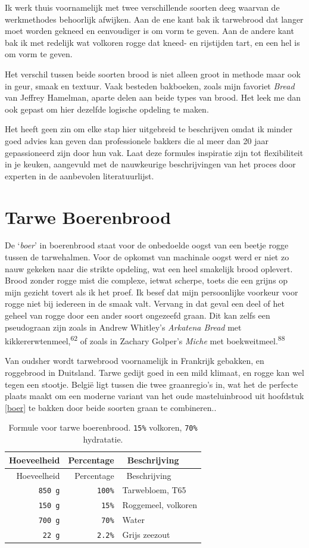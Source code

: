 \documentclass[
  11pt,
  dutch,
]{memoir}
\begin{document}
Ik werk thuis voornamelijk met twee verschillende soorten deeg waarvan
de werkmethodes behoorlijk afwijken. Aan de ene kant bak ik tarwebrood
dat langer moet worden gekneed en eenvoudiger is om vorm te geven. Aan
de andere kant bak ik met redelijk wat volkoren rogge dat kneed- en
rijstijden tart, en een hel is om vorm te geven.

Het verschil tussen beide soorten brood is niet alleen groot in methode
maar ook in geur, smaak en textuur. Vaak besteden bakboeken, zoals mijn
favoriet \emph{Bread} van Jeffrey Hamelman, aparte delen aan beide types
van brood. Het leek me dan ook gepast om hier dezelfde logische opdeling
te maken.

Het heeft geen zin om elke stap hier uitgebreid te beschrijven omdat ik
minder goed advies kan geven dan professionele bakkers die al meer dan
20 jaar gepassioneerd zijn door hun vak. Laat deze formules inspiratie
zijn tot flexibiliteit in je keuken, aangevuld met de nauwkeurige
beschrijvingen van het proces door experten in de aanbevolen
literatuurlijst.

\hypertarget{tarwe-boerenbrood}{%
\section{Tarwe Boerenbrood}\label{tarwe-boerenbrood}}

De `\emph{boer}' in boerenbrood staat voor de onbedoelde oogst van een
beetje rogge tussen de tarwehalmen. Voor de opkomst van machinale oogst
werd er niet zo nauw gekeken naar die strikte opdeling, wat een heel
smakelijk brood oplevert. Brood zonder rogge mist die complexe, ietwat
scherpe, toets die een grijns op mijn gezicht tovert als ik het proef.
Ik besef dat mijn persoonlijke voorkeur voor rogge niet bij iedereen in
de smaak valt. Vervang in dat geval een deel of het geheel van rogge
door een ander soort ongezeefd graan. Dit kan zelfs een pseudograan zijn
zoals in Andrew Whitley's \emph{Arkatena Bread} met
kikkererwtenmeel,\textsuperscript{62} of zoals in Zachary Golper's
\emph{Miche} met boekweitmeel.\textsuperscript{88}

Van oudsher wordt tarwebrood voornamelijk in Frankrijk gebakken, en
roggebrood in Duitsland. Tarwe gedijt goed in een mild klimaat, en rogge
kan wel tegen een stootje. België ligt tussen die twee graanregio's in,
wat het de perfecte plaats maakt om een moderne variant van het oude
masteluinbrood uit hoofdstuk \ref{boer} te bakken door beide soorten
graan te combineren..

\begin{longtable}[]{@{}rrl@{}}
\caption{Formule voor tarwe boerenbrood. \texttt{15\%} volkoren,
\texttt{70\%} hydratatie.}\tabularnewline
\toprule
Hoeveelheid & Percentage & ~Beschrijving\tabularnewline
\midrule
\endfirsthead
\toprule
Hoeveelheid & Percentage & ~Beschrijving\tabularnewline
\midrule
\endhead
\texttt{850\ g} & \texttt{100\%} & Tarwebloem, T65\tabularnewline
\texttt{150\ g} & \texttt{15\%} & Roggemeel, volkoren\tabularnewline
\texttt{700\ g} & \texttt{70\%} & Water\tabularnewline
\texttt{22\ g} & \texttt{2.2\%} & Grijs zeezout\tabularnewline
\bottomrule
\end{longtable}
\end{document}

